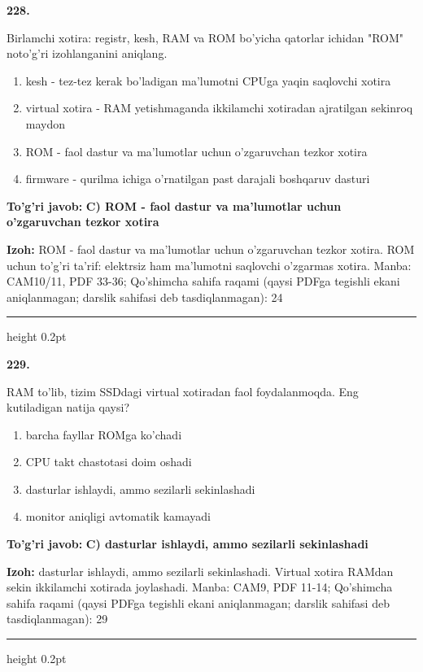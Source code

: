 \documentclass[10pt,a4paper]{article}
\begin{document}
{\bfseries\sffamily\color{ink} 228.}
\par
Birlamchi xotira: registr, kesh, RAM va ROM bo'yicha qatorlar ichidan "ROM" noto'g'ri izohlanganini aniqlang.
\begin{enumerate}[label=\Alph*),leftmargin=9mm]
\item kesh - tez-tez kerak bo'ladigan ma'lumotni CPUga yaqin saqlovchi xotira
\item virtual xotira - RAM yetishmaganda ikkilamchi xotiradan ajratilgan sekinroq maydon
\item ROM - faol dastur va ma'lumotlar uchun o'zgaruvchan tezkor xotira
\item firmware - qurilma ichiga o'rnatilgan past darajali boshqaruv dasturi
\end{enumerate}
\begin{tcolorbox}[enhanced,breakable,colback=teal!4,colframe=teal!60!black,boxrule=0.45pt,arc=1.2mm,left=2.7mm,right=2.7mm,top=1.8mm,bottom=1.8mm,before skip=2mm,after skip=2mm]
{\bfseries\sffamily\color{teal}To'g'ri javob:} \textbf{C) ROM - faol dastur va ma'lumotlar uchun o'zgaruvchan tezkor xotira}
\par\smallskip
{\bfseries Izoh:} ROM - faol dastur va ma'lumotlar uchun o'zgaruvchan tezkor xotira. ROM uchun to'g'ri ta'rif: elektrsiz ham ma'lumotni saqlovchi o'zgarmas xotira. Manba: CAM10/11, PDF 33-36; Qo'shimcha sahifa raqami (qaysi PDFga tegishli ekani aniqlanmagan; darslik sahifasi deb tasdiqlanmagan): 24
\end{tcolorbox}
\vspace{2mm}\hrule height 0.2pt\vspace{3mm}

{\bfseries\sffamily\color{ink} 229.}
\par
RAM to'lib, tizim SSDdagi virtual xotiradan faol foydalanmoqda. Eng kutiladigan natija qaysi?
\begin{enumerate}[label=\Alph*),leftmargin=9mm]
\item barcha fayllar ROMga ko'chadi
\item CPU takt chastotasi doim oshadi
\item dasturlar ishlaydi, ammo sezilarli sekinlashadi
\item monitor aniqligi avtomatik kamayadi
\end{enumerate}
\begin{tcolorbox}[enhanced,breakable,colback=teal!4,colframe=teal!60!black,boxrule=0.45pt,arc=1.2mm,left=2.7mm,right=2.7mm,top=1.8mm,bottom=1.8mm,before skip=2mm,after skip=2mm]
{\bfseries\sffamily\color{teal}To'g'ri javob:} \textbf{C) dasturlar ishlaydi, ammo sezilarli sekinlashadi}
\par\smallskip
{\bfseries Izoh:} dasturlar ishlaydi, ammo sezilarli sekinlashadi. Virtual xotira RAMdan sekin ikkilamchi xotirada joylashadi. Manba: CAM9, PDF 11-14; Qo'shimcha sahifa raqami (qaysi PDFga tegishli ekani aniqlanmagan; darslik sahifasi deb tasdiqlanmagan): 29
\end{tcolorbox}
\vspace{2mm}\hrule height 0.2pt\vspace{3mm}
\end{document}
